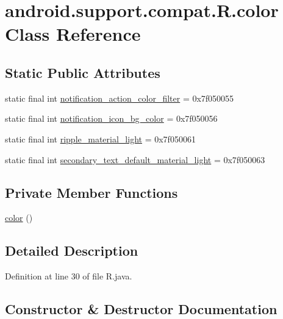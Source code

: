 \hypertarget{classandroid_1_1support_1_1compat_1_1_r_1_1color}{}\section{android.\+support.\+compat.\+R.\+color Class Reference}
\label{classandroid_1_1support_1_1compat_1_1_r_1_1color}
\subsection*{Static Public Attributes}
\begin{DoxyCompactItemize}
\item 
static final int \mbox{\hyperlink{classandroid_1_1support_1_1compat_1_1_r_1_1color_a9d17db1ac8d9019703d6eb308d2618bc}{notification\+\_\+action\+\_\+color\+\_\+filter}} = 0x7f050055
\item 
static final int \mbox{\hyperlink{classandroid_1_1support_1_1compat_1_1_r_1_1color_aa6943b5b8f0e0a0a86e7434f741f18f0}{notification\+\_\+icon\+\_\+bg\+\_\+color}} = 0x7f050056
\item 
static final int \mbox{\hyperlink{classandroid_1_1support_1_1compat_1_1_r_1_1color_a9963bd6162040fda401e2439613f89c4}{ripple\+\_\+material\+\_\+light}} = 0x7f050061
\item 
static final int \mbox{\hyperlink{classandroid_1_1support_1_1compat_1_1_r_1_1color_ab34b571512153e84b130cbc074e1271a}{secondary\+\_\+text\+\_\+default\+\_\+material\+\_\+light}} = 0x7f050063
\end{DoxyCompactItemize}
\subsection*{Private Member Functions}
\begin{DoxyCompactItemize}
\item 
\mbox{\hyperlink{classandroid_1_1support_1_1compat_1_1_r_1_1color_a2cb02c13b56c35a90748a9d6c3d9ae0c}{color}} ()
\end{DoxyCompactItemize}


\subsection{Detailed Description}


Definition at line 30 of file R.\+java.



\subsection{Constructor \& Destructor Documentation}
\mbox{\label{classandroid_1_1support_1_1compat_1_1_r_1_1color_a2cb02c13b56c35a90748a9d6c3d9ae0c}} 
